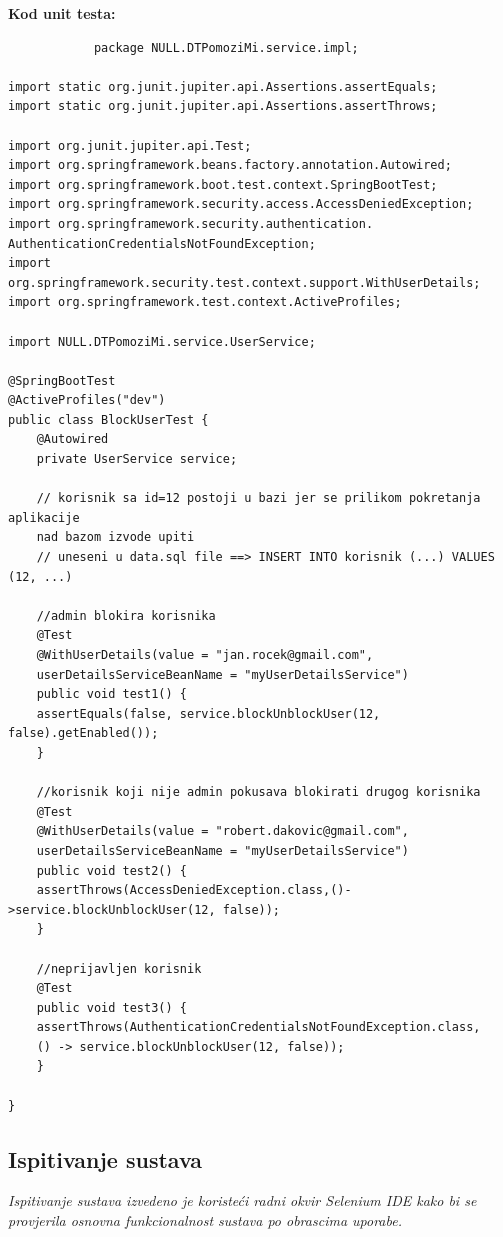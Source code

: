             \noindent \textbf{Kod unit testa: }
            \begin{verbatim}
            package NULL.DTPomoziMi.service.impl;

import static org.junit.jupiter.api.Assertions.assertEquals;
import static org.junit.jupiter.api.Assertions.assertThrows;

import org.junit.jupiter.api.Test;
import org.springframework.beans.factory.annotation.Autowired;
import org.springframework.boot.test.context.SpringBootTest;
import org.springframework.security.access.AccessDeniedException;
import org.springframework.security.authentication.
AuthenticationCredentialsNotFoundException;
import org.springframework.security.test.context.support.WithUserDetails;
import org.springframework.test.context.ActiveProfiles;

import NULL.DTPomoziMi.service.UserService;

@SpringBootTest
@ActiveProfiles("dev")
public class BlockUserTest {
	@Autowired
	private UserService service;

	// korisnik sa id=12 postoji u bazi jer se prilikom pokretanja aplikacije
	nad bazom izvode upiti 
	// uneseni u data.sql file ==> INSERT INTO korisnik (...) VALUES (12, ...)

	//admin blokira korisnika
	@Test
	@WithUserDetails(value = "jan.rocek@gmail.com",
	userDetailsServiceBeanName = "myUserDetailsService")
	public void test1() { 
	assertEquals(false,	service.blockUnblockUser(12, false).getEnabled());
	}

	//korisnik koji nije admin pokusava blokirati drugog korisnika
	@Test
	@WithUserDetails(value = "robert.dakovic@gmail.com",
	userDetailsServiceBeanName = "myUserDetailsService")
	public void test2() {
	assertThrows(AccessDeniedException.class,()->service.blockUnblockUser(12, false));
	}

	//neprijavljen korisnik
	@Test
	public void test3() {
	assertThrows(AuthenticationCredentialsNotFoundException.class, 
	() -> service.blockUnblockUser(12, false)); 
	}

}
            \end{verbatim}
            
			\subsection{Ispitivanje sustava}
			
			 \textit{Ispitivanje sustava izvedeno je koristeći radni okvir Selenium IDE kako bi se provjerila osnovna funkcionalnost
             sustava po obrascima uporabe.\\ }
			 
